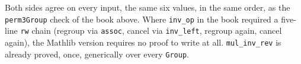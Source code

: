 Both sides agree on every input, the same six values, in the same order, as the \texttt{perm3Group} check of the book above. Where \texttt{inv\_\allowbreak{}op} in the book required a five-line \texttt{rw} chain (regroup via \texttt{assoc}, cancel via \texttt{inv\_\allowbreak{}left}, regroup again, cancel again), the Mathlib version requires no proof to write at all. \texttt{mul\_\allowbreak{}inv\_\allowbreak{}rev} is already proved, once, generically over every \texttt{Group}.
